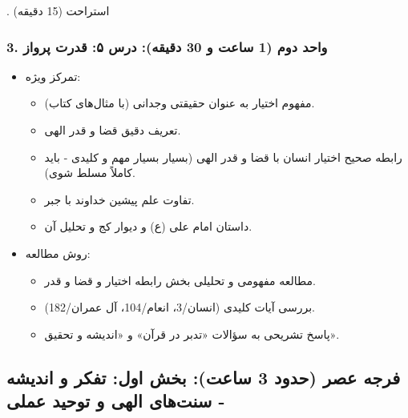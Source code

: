 \documentclass{article}
\begin{document}
\vspace{\baselineskip} %
. استراحت (15 دقیقه)
\vspace{\baselineskip} %

\subsubsection*{3. واحد دوم (1 ساعت و 30 دقیقه): درس ۵: قدرت پرواز}
\begin{itemize}
    \item تمرکز ویژه:
    \begin{itemize}
        \item مفهوم اختیار به عنوان حقیقتی وجدانی (با مثال‌های کتاب).
        \item تعریف دقیق قضا و قدر الهی.
        \item رابطه صحیح اختیار انسان با قضا و قدر الهی (بسیار بسیار مهم و کلیدی - باید کاملاً مسلط شوی).
        \item تفاوت علم پیشین خداوند با جبر.
        \item داستان امام علی (ع) و دیوار کج و تحلیل آن.
    \end{itemize}
    \item روش مطالعه:
    \begin{itemize}
        \item مطالعه مفهومی و تحلیلی بخش رابطه اختیار و قضا و قدر.
        \item بررسی آیات کلیدی (انسان/3، انعام/104، آل عمران/182).
        \item پاسخ تشریحی به سؤالات «تدبر در قرآن» و «اندیشه و تحقیق».
    \end{itemize}
\end{itemize}

\bigskip
\hrulefill
\bigskip

\subsection*{فرجه عصر (حدود 3 ساعت): بخش اول: تفکر و اندیشه - سنت‌های الهی و توحید عملی}
\end{document}
